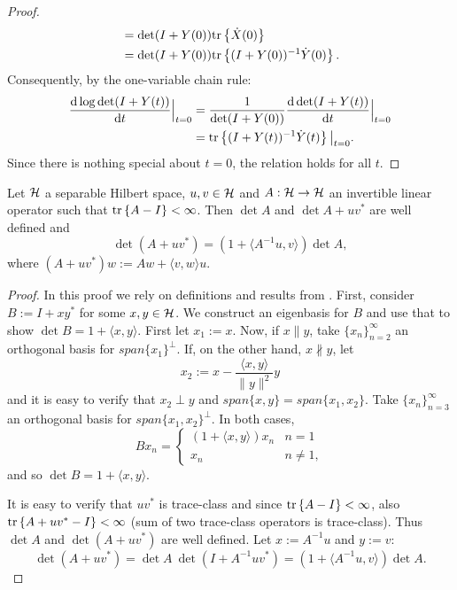 \documentclass{amsart}
\numberwithin{equation}{section}
\begin{document}
\begin{proof}
\begin{align*}
    &= \det (I+Y(0)) \textup{tr}\left \{\dot{X}(0) \right \} \\
    &= \det (I+Y(0)) \textup{tr}\left \{(I+Y(0))^{-1} \dot{Y}(0) \right \}.
  \end{align*}
  Consequently, by the one-variable chain rule:
  \begin{align*}
    \frac{\text{\textup{d}} \log \det (I+Y(t))}{\text{\textup{d}} t}\Big |_{t=0} &=
    \frac{1}{\det (I+Y(0))}\frac{\text{\textup{d}} \det (I+Y(t))}{\text{\textup{d}} t}\Big |_{t=0} \\ 
    &= \textup{tr}\left \{ (I+Y(t))^{-1} \dot{Y}(t) \right \} \big |_{t=0}.
  \end{align*}
  Since there is nothing special about $t=0$, the relation holds for all $t$.
\end{proof}


\begin{lemma}\label{lemma:MDL}
  Let $\mathcal{H}$ a separable Hilbert space, $u,v\in \mathcal{H}$ and $A: \mathcal{H} \to
  \mathcal{H}$ an invertible linear operator such that $\textup{tr}\left \{A-I \right \} <
  \infty$. Then $\det A$ and $\det A + uv^*$ are well defined and
  \begin{equation*}
    \det (A + uv^*) = (1 + \langle A^{-1} u, v \rangle ) \det A,
  \end{equation*}
  where $(A + uv^*)w := Aw + \langle v,w \rangle u$.
\end{lemma}
\begin{proof}
  In this proof we rely on definitions and results from
  \cite{Simon77}. First, consider $B := I + xy^*$ for some $x,y \in
  \mathcal{H}$. We construct an eigenbasis for $B$ and use that to show $\det
  B = 1 + \langle x, y \rangle$. First let $x_1 := x$.  Now, if $x
  \parallel y$, take $\{x_n \}_{n=2}^{\infty}$ an orthogonal basis for
  $span\{x_1\} ^{\perp}$. If, on the other hand, $x \nparallel y$, let
  \begin{equation*}
    x_2 := x - \frac{ \langle x, y\rangle}{\|y\|^2}y
  \end{equation*}
  and it is easy to verify that $x_2 \perp y$ and $span \{x,y\} = span
  \{x_1,x_2\}$. Take $\{x_n \}_{n=3}^{\infty}$ an orthogonal basis for
  $span\{x_1,x_2\} ^{\perp}$. In both cases,
  \begin{equation*}
    B x_n =
    \begin{cases}
      (1 + \langle x, y \rangle) x_n & n = 1 \\
      x_n                            & n \neq 1,
    \end{cases}
  \end{equation*}
  and so $\det B = 1 + \langle x, y \rangle$.
  
  It is easy to verify that $uv^*$ is trace-class and since $\textup{tr}\left \{A-I \right \}
  < \infty$, also $\textup{tr}\left \{A + uv^* - I \right \} < \infty$ (sum of two trace-class
  operators is trace-class). Thus $\det A$ and $\det (A+uv^*)$ are
  well defined. Let $x:=A^{-1}u$ and $y := v$:
  \begin{equation*}
    \det (A + uv^*) = \det A \ \det(I+A^{-1}uv^*) =
    (1 + \langle A^{-1}u, v \rangle) \det A .
  \end{equation*}
\end{proof}
\end{document}
